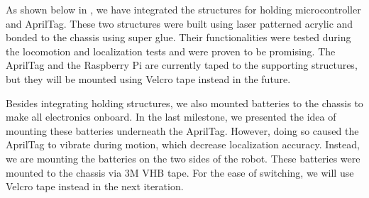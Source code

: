 As shown below in , we have integrated the structures for holding microcontroller and AprilTag. These two structures were built using laser patterned acrylic and bonded to the chassis using super glue. Their functionalities were tested during the locomotion and localization tests and were proven to be promising. The AprilTag and the Raspberry Pi are currently taped to the supporting structures, but they will be mounted using Velcro tape instead in the future. 

Besides integrating holding structures, we also mounted batteries to the chassis to make all electronics onboard. In the last milestone, we presented the idea of mounting these batteries underneath the AprilTag. However, doing so caused the AprilTag to vibrate during motion, which decrease localization accuracy.  Instead, we are mounting the batteries on the two sides of the robot. These batteries were mounted to the chassis via 3M VHB tape. For the ease of switching, we will use Velcro tape instead in the next iteration. 

